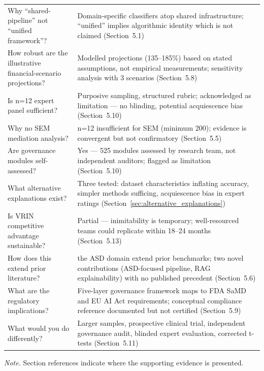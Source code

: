 \begin{table}[!htbp]
\begin{tabularx}{\textwidth}{@{} p{} L @{}}
\addlinespace
Why ``shared-pipeline'' not ``unified framework''? & Domain-specific classifiers atop shared infrastructure; ``unified'' implies algorithmic identity which is not claimed (Section~5.1) \\
\addlinespace
How robust are the illustrative financial-scenario projections? & Modelled projections (135--185\%) based on stated assumptions, not empirical measurements; sensitivity analysis with 3 scenarios (Section~5.8) \\
\addlinespace
Is n=12 expert panel sufficient? & Purposive sampling, structured rubric; acknowledged as limitation --- no blinding, potential acquiescence bias (Section~5.10) \\
\addlinespace
Why no SEM mediation analysis? & n=12 insufficient for SEM (minimum 200); evidence is convergent but not confirmatory (Section~5.5) \\
\addlinespace
Are governance modules self-assessed? & Yes --- 525 modules assessed by research team, not independent auditors; flagged as limitation (Section~5.10) \\
\addlinespace
What alternative explanations exist? & Three tested: dataset characteristics inflating accuracy, simpler methods sufficing, acquiescence bias in expert ratings (Section~\ref{sec:alternative_explanations}) \\
\addlinespace
Is VRIN competitive advantage sustainable? & Partial --- inimitability is temporary; well-resourced teams could replicate within 18--24 months (Section~5.13) \\
\addlinespace
How does this extend prior literature? & the ASD domain extend prior benchmarks; two novel contributions (ASD-focused pipeline, RAG explainability) with no published precedent (Section~5.6) \\
\addlinespace
What are the regulatory implications? & Five-layer governance framework maps to FDA SaMD and EU AI Act requirements; conceptual compliance reference documented but not certified (Section~5.9) \\
\addlinespace
What would you do differently? & Larger samples, prospective clinical trial, independent governance audit, blinded expert evaluation, corrected t-tests (Section~5.11) \\
\bottomrule
\end{tabularx}
\vspace{0.5em}\noindent\textit{Note.} Section references indicate where the supporting evidence is presented.
\end{table}
\fi %

